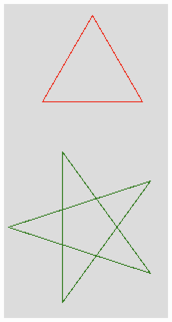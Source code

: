 \documentclass[rgb]{beamer}
\begin{document}
\begin{frame}[fragile]
\begin{footnotesize}
\begin{minipage}[b]{0.2\textwidth}
  \includegraphics[width=\textwidth]{../images/turtle0.png}

\end{minipage}

\end{footnotesize}
\end{frame}
\end{document}
